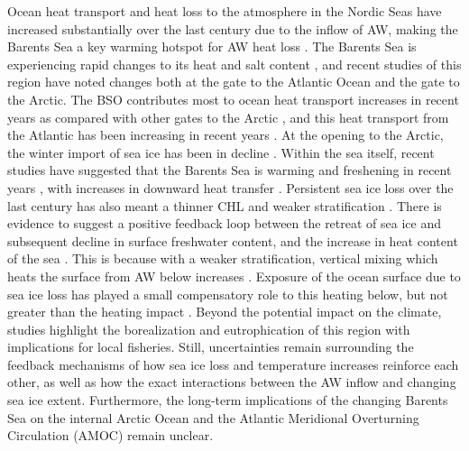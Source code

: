 \documentclass[a4paper,12pt]{article}
\begin{document}
    Ocean heat transport and heat loss to the atmosphere in the Nordic Seas have increased substantially over the last century due to the inflow of AW, making the Barents Sea a key warming hotspot for AW heat loss \cite{Smedsrud2022}. The Barents Sea is experiencing rapid changes to its heat and salt content \cite{Cosimo2014}, and recent studies of this region have noted changes both at the gate to the Atlantic Ocean and the gate to the Arctic. The BSO contributes most to ocean heat transport increases in recent years as compared with other gates to the Arctic \cite{Oldenburg2024}, and this heat transport from the Atlantic has been increasing in recent years \cite{Barton18,Wang2019}. At the opening to the Arctic, the winter import of sea ice has been in decline \cite{Lind2018,Lundesgaard2022}. Within the sea itself, recent studies have suggested that the Barents Sea is warming and freshening in recent years \cite{Skagseth2020}, with increases in downward heat transfer \cite{Lind2018}. Persistent sea ice loss over the last century has also meant a thinner CHL and weaker stratification \cite{Onarheim2017,Gerland2023}. There is evidence to suggest a positive feedback loop between the retreat of sea ice and subsequent decline in surface freshwater content, and the increase in heat content of the sea \cite{Arthun2012,Lind2018,Isaksen2022}. This is because with a weaker stratification, vertical mixing which heats the surface from AW below increases \cite{Lundesgaard2022}. Exposure of the ocean surface due to sea ice loss has played a small compensatory role to this heating below, but not greater than the heating impact \cite{Oldenburg2024}. Beyond the potential impact on the climate, studies highlight the borealization \cite{Lind2018,Isaksen2022} and eutrophication \cite{Downes2021} of this region with implications for local fisheries. Still, uncertainties remain surrounding the feedback mechanisms of how sea ice loss and temperature increases reinforce each other, as well as how the exact interactions between the AW inflow and changing sea ice extent. Furthermore, the long-term implications of the changing Barents Sea on the internal Arctic Ocean and the Atlantic Meridional Overturning Circulation (AMOC) remain unclear.
\end{document}
